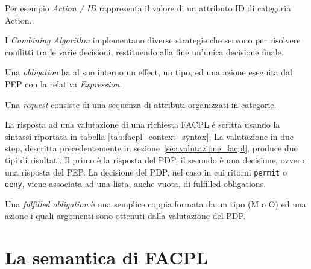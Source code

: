 Per esempio \textit{Action / ID} rappresenta il valore di un attributo ID di categoria Action.\\ \par
I \textit{Combining Algorithm} implementano diverse strategie che servono per risolvere conflitti tra le varie decisioni, restituendo alla fine un'unica decisione finale.\\ \par
Una \textit{obligation} ha al suo interno un effect, un tipo, ed una azione eseguita dal PEP con la relativa \textit{Expression}.\\ \par
Una \textit{request} consiste di una sequenza di attributi organizzati in categorie.\\ \par
La risposta ad una valutazione di una richiesta FACPL è scritta usando la sintassi riportata in tabella \ref{tab:facpl_context_syntax}.
La valutazione in due step, descritta precedentemente in sezione~\ref{sec:valutazione_facpl}, produce due tipi di risultati. Il primo è la risposta del PDP, il secondo è una decisione, ovvero una risposta del PEP.
La decisione del PDP, nel caso in cui ritorni \texttt{permit} o \texttt{deny}, viene associata ad una lista, anche vuota, di fulfilled obligations.\\ \par
Una \textit{fulfilled obligation} è una semplice coppia formata da un tipo (M o O) ed una azione i quali argomenti sono ottenuti dalla valutazione del PDP.

\section{La semantica di FACPL}
\label{sec:semantica_originale}

